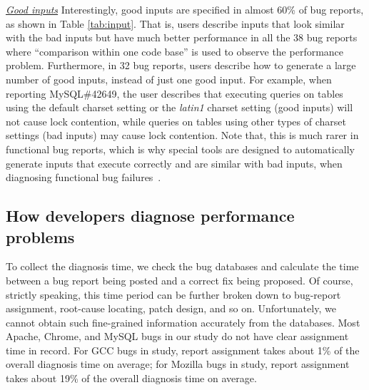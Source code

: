 \underline{\it Good inputs} Interestingly, good inputs are specified in almost
60\% of bug reports, as shown in Table \ref{tab:input}. 
That is, users describe inputs that look similar with the
bad inputs but have much better performance in all the 38 bug reports
where ``comparison within one code base'' is used to observe the performance
problem.
Furthermore,
in 32 bug reports, users describe how to generate a large number of good
inputs, instead of just one good input.
For example, when reporting MySQL\#42649, the user
describes that executing queries on tables using the default charset setting or
the \textit{latin1} charset setting (good inputs) will not cause lock contention, while queries
on tables using other types of charset settings (bad inputs) may cause lock contention.
Note that, this is much rarer in functional bug reports, which is why special
tools are
designed to automatically generate inputs that execute correctly
and are similar with bad inputs, when diagnosing functional bug failures~\citep{delta}.




\subsection{How developers diagnose performance problems}

To collect the diagnosis time, we check the bug databases and calculate the
time between a bug report being posted and a correct fix being proposed.
Of course, strictly speaking, this time period can be further broken down to
bug-report assignment, root-cause locating, patch design, and so on. 
Unfortunately, we cannot obtain such fine-grained information accurately
from the databases. Most Apache, Chrome, and MySQL bugs in
our study do not have clear assignment time in record. For GCC bugs in
study, report assignment takes about 1\% of the overall diagnosis
time on average; for Mozilla bugs in study, report assignment takes about
19\% of the overall diagnosis time on average.

